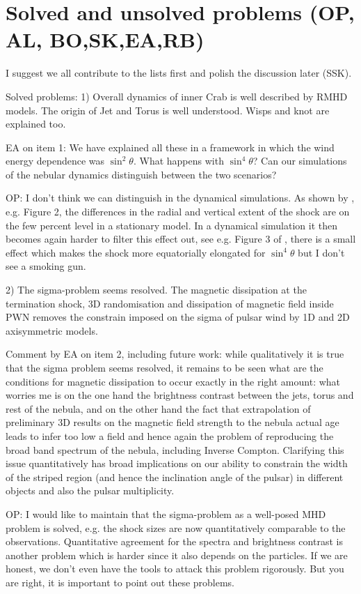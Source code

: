\section{Solved and unsolved problems      (OP, AL, BO,SK,EA,RB)}
\label{sec:discussion}

I suggest we all contribute to the lists first and polish the discussion later (SSK). 

Solved problems: 
1) Overall dynamics of inner Crab is well described by RMHD models. The origin of Jet and Torus is well understood. Wisps and knot are explained too.

EA on item 1: We have explained all these in a framework in which the wind energy dependence was $\sin^2\theta$. What happens with $\sin^4\theta$? Can our simulations of the nebular dynamics distinguish between the two scenarios?

OP: I don't think we can distinguish in the dynamical simulations.  As shown by \cite{LyutikovKomissarov2016}, e.g. Figure 2, the differences in the radial and vertical extent of the shock are on the few percent level in a stationary model.  In a dynamical simulation it then becomes again harder to filter this effect out, see e.g. Figure 3 of \cite{BuhlerGiomi2016}, there is a small effect which makes the shock more equatorially elongated for $\sin^4\theta$ but I don't see a smoking gun.  

2) The sigma-problem seems resolved. The magnetic dissipation at the termination shock, 3D randomisation and dissipation of magnetic field inside PWN removes the constrain imposed on the sigma of pulsar wind by 1D and 2D axisymmetric models.

Comment by EA on item 2, including future work: while qualitatively it is true that the sigma problem seems resolved, it remains to be seen what are the conditions for magnetic dissipation to occur exactly in the right amount: what worries me is on the one hand the brightness contrast between the jets, torus and rest of the nebula, and on the other hand the fact that extrapolation of preliminary 3D results on the magnetic field strength to the nebula actual age leads to infer too low a field and hence again the problem of reproducing the broad band spectrum of the nebula, including Inverse Compton.
Clarifying this issue quantitatively has broad implications on our ability to constrain the width of the striped region (and hence the inclination angle of the pulsar) in different objects and also the pulsar multiplicity. 

OP: I would like to maintain that the sigma-problem as a well-posed MHD problem is solved, e.g. the shock sizes are now quantitatively comparable to the observations.  Quantitative agreement for the spectra and brightness contrast is another problem which is harder since it also depends on the particles.  If we are honest, we don't even have the tools to attack this problem rigorously.  But you are right, it is important to point out these problems.  

